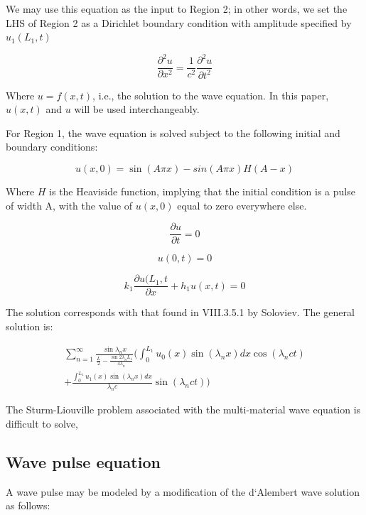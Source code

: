 \documentclass[twocolumn, letterpaper]{article}
\begin{document}
We may use this equation as the input to Region 2; in other words, we set the LHS of Region 2 as a Dirichlet boundary condition with amplitude specified by $u_1(L_1,t)$



\begin{equation}
\frac{\partial^2 u}{\partial x^2} = \frac{1}{c^2}\frac{\partial^2 u}{\partial t^2}
\end{equation}

Where $u = f(x,t)$, i.e., the solution to the wave equation. In this paper, $u(x,t)$ and $u$ will be used interchangeably.

For Region 1, the wave equation is solved  subject to the following initial and boundary conditions:

\begin{equation}
u(x,0) = \sin(A\pi x) - sin(A\pi x)H(A-x)
\end{equation}

Where $H$ is the Heaviside function, implying that the initial condition is a pulse of width A, with the value of $u(x,0)$ equal to zero everywhere else.

\begin{equation}
\frac{\partial u}{\partial t} = 0
\end{equation}

\begin{equation}
u(0,t) = 0
\end{equation}

\begin{equation}
k_1\frac{\partial u(L_1,t}{\partial x} + h_1 u(x,t) =0
\end{equation}

The solution corresponds with that found in VIII.3.5.1 by Soloviev. The general solution is:

\begin{multline}
\sum _{n=1} ^\infty \frac{\sin\lambda_nx}{\frac{L}{2} - \frac{\sin 2 \lambda_n L_1}{4\lambda_n}} \Bigg(\int_0^{L_1} u_0(x)\sin(\lambda_nx)dx \cos(\lambda_nct) \\
 + \frac{\int_0^{L_1}u_1(x)\sin(\lambda_nx)dx}{\lambda_n c}\sin(\lambda_nct)\Bigg)
\end{multline}

The Sturm-Liouville problem associated with the multi-material wave equation is difficult to solve, 

\subsection{Wave pulse equation}
A wave pulse may be modeled by a modification of the d`Alembert wave  solution as follows:
\end{document}
